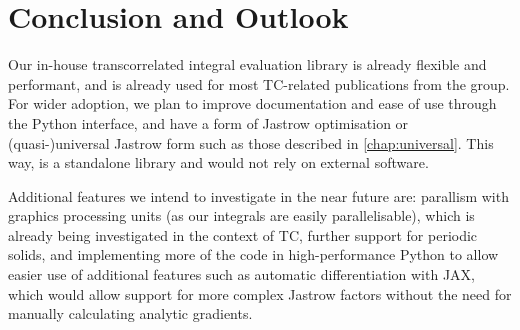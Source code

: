 \section{Conclusion and Outlook}

Our in-house transcorrelated integral evaluation library is already flexible and performant, and is already used for most TC-related publications from the group. For wider adoption, we plan to improve documentation and ease of use through the Python interface, and have a form of Jastrow optimisation or (quasi-)universal Jastrow form such as those described in \autoref{chap:universal}. This way, \pytchint is a standalone library and would not rely on external software.

Additional features we intend to investigate in the near future are: parallism with graphics processing units (as our integrals are easily parallelisable), which is already being investigated in the context of TC, further support for periodic solids, and implementing more of the code in high-performance Python to allow easier use of additional features such as automatic differentiation with JAX, which would allow support for more complex Jastrow factors without the need for manually calculating analytic gradients.
